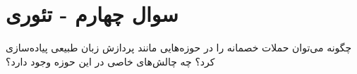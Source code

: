 \section{سوال چهارم - تئوری}
چگونه می‌توان حملات خصمانه را در حوزه‌هایی مانند پردازش زبان طبیعی پیاده‌سازی کرد؟ چه چالش‌های خاصی در این حوزه وجود دارد؟




\begin{qsolve}

\end{qsolve}


